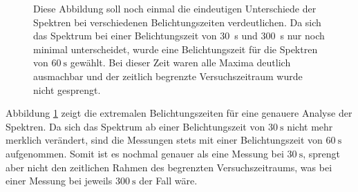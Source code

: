 \begin{figure}[H]
    \centering
    \resizebox{0.8\textwidth}{!}{}   
    \caption[Eindeutige Unterschiede der Spektren bei verschiedenen Belichtungszeiten]{Diese Abbildung soll noch einmal die eindeutigen Unterschiede der Spektren bei verschiedenen Belichtungszeiten verdeutlichen. Da sich das Spektrum bei einer Belichtungszeit von \SI{30}{\second} und \SI{300}{\second} nur noch minimal unterscheidet, wurde eine Belichtungszeit für die Spektren von $\SI{60}{\second}$ gewählt. Bei dieser Zeit waren alle Maxima deutlich ausmachbar und der zeitlich begrenzte Versuchszeitraum wurde nicht gesprengt.}
    \label{fig:BelichtungszeitExtremal}
\end{figure}

Abbildung \ref{fig:BelichtungszeitExtremal} zeigt die extremalen Belichtungszeiten für eine genauere Analyse der Spektren. Da sich das Spektrum ab einer Belichtungszeit von $\SI{30}{\second}$ nicht mehr merklich verändert, sind die Messungen stets mit einer Belichtungszeit von $\SI{60}{\second}$ aufgenommen. Somit ist es nochmal genauer als eine Messung bei $\SI{30}{\second}$, sprengt aber nicht den zeitlichen Rahmen des begrenzten Versuchszeitraums, was bei einer Messung bei jeweils $\SI{300}{\second}$ der Fall wäre.

